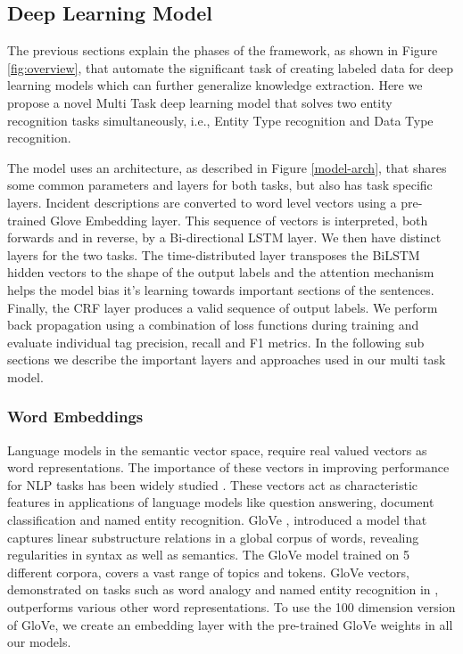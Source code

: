 \newcommand{\addREf}{\todo{REF HERE}}

\subsection{\softner{} Deep Learning Model}
\label{sec:multi-task-model}
The previous sections explain the phases of the \softner{} framework, as shown in Figure \ref{fig:overview}, that automate the significant task of creating labeled data for deep learning models which can further generalize knowledge extraction. Here we propose a novel Multi Task deep learning model that solves two entity recognition tasks simultaneously, i.e., Entity Type recognition and Data Type recognition.

The model uses an architecture, as described in Figure \ref{model-arch}, that shares some common parameters and layers for both tasks, but also has task specific layers. Incident descriptions are converted to word level vectors using a pre-trained Glove Embedding layer. This sequence of vectors is interpreted, both forwards and in reverse, by a Bi-directional LSTM layer. We then have distinct layers for the two tasks. The time-distributed layer transposes the BiLSTM hidden vectors to the shape of the output labels and the attention mechanism helps the model bias it's learning towards important sections of the sentences. Finally, the CRF layer produces a valid sequence of output labels. We perform back propagation using a combination of loss functions during training and evaluate individual tag precision, recall and F1 metrics. In the following sub sections we describe the important layers and approaches used in our multi task model.

\subsubsection{\textbf{Word Embeddings}}
\label{sec:glove-word-emb}
Language models in the semantic vector space, require real valued vectors as word representations. The importance of these vectors in improving performance for NLP tasks has been widely studied \cite{collobert2011natural}. These vectors act as characteristic features in applications of language models like question answering, document classification and named entity recognition.
GloVe \cite{pennington2014glove}, introduced a model that captures linear substructure relations in a global corpus of words, revealing regularities in syntax as well as semantics. The GloVe model trained on 5 different corpora, covers a vast range of topics and tokens. GloVe vectors, demonstrated on tasks such as word analogy and named entity recognition in \cite{pennington2014glove}, outperforms various other word representations. To use the 100 dimension version of GloVe, we create an embedding layer with the pre-trained GloVe weights in all our models.


